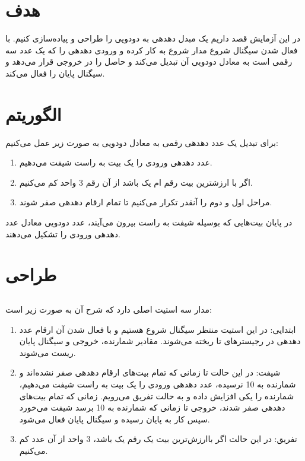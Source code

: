 \documentclass{article}
\begin{document}
\section{هدف}
در این آزمایش قصد داریم یک مبدل دهدهی به دودویی را طراحی و پیاده‌سازی کنیم. با فعال شدن سیگنال شروع مدار شروع به کار کرده و ورودی دهدهی را که یک عدد سه رقمی است به معادل دودویی آن تبدیل می‌کند و حاصل را در خروجی قرار می‌دهد و سیگنال پایان را فعال می‌کند.

\section{الگوریتم}
برای تبدیل یک عدد دهدهی رقمی به معادل دودویی به صورت زیر عمل می‌کنیم:
\begin{enumerate}
	\item عدد دهدهی ورودی را یک بیت به راست شیفت می‌دهیم.
	
	\item اگر با ارزشترین بیت رقم ام یک باشد از آن رقم 3 واحد کم می‌کنیم.
	
	\item مراحل اول و دوم را آنقدر تکرار می‌کنیم تا تمام ارقام دهدهی صفر شوند.
	
\end{enumerate}
 
در پایان بیت‌هایی که بوسیله شیفت به راست بیرون می‌آیند، عدد دودویی معادل عدد دهدهی ورودی را تشکیل می‌دهند.

\section{طراحی}
\subsection{} 
مدار سه استیت اصلی دارد که شرح آن به صورت زیر است:
\begin{enumerate}
\item ابتدایی: در این استیت منتظر سیگنال شروع هستیم و با فعال شدن آن ارقام عدد دهدهی در رجیسترهای  تا  ریخته می‌شوند. مقادیر شمارنده، خروجی و سیگنال پایان ریست می‌شوند.

\item شیفت: در این حالت تا زمانی که تمام بیت‌های ارقام دهدهی صفر نشده‌اند و شمارنده به 10 نرسیده، عدد دهدهی ورودی را یک بیت به راست شیفت می‌دهیم، شمارنده را یکی افزایش داده و به حالت تفریق می‌رویم. زمانی که تمام بیت‌های دهدهی صفر شدند، خروجی تا زمانی که شمارنده به 10 برسد شیفت می‌خورد سپس کار به پایان رسیده و سیگنال پایان فعال می‌شود.

\item تفریق: در این حالت اگر باارزش‌ترین بیت یک رقم یک باشد، 3 واحد از آن عدد کم می‌کنیم.
\end{enumerate}
\end{document}
